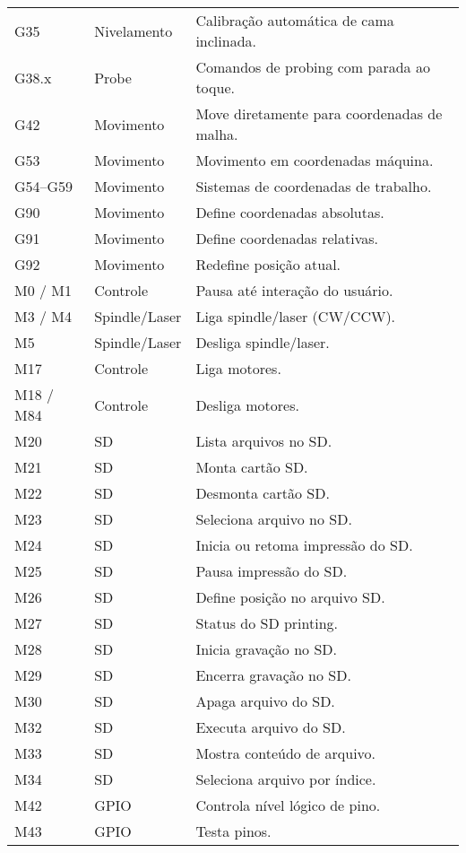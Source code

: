 \begin{longtable}{|l|l|p{\funcwidth}|}
			G35 & Nivelamento & Calibração automática de cama inclinada. \\
			G38.x & Probe & Comandos de probing com parada ao toque. \\
			G42 & Movimento & Move diretamente para coordenadas de malha. \\
			G53 & Movimento & Movimento em coordenadas máquina. \\
			G54--G59 & Movimento & Sistemas de coordenadas de trabalho. \\
			G90 & Movimento & Define coordenadas absolutas. \\
			G91 & Movimento & Define coordenadas relativas. \\
			G92 & Movimento & Redefine posição atual. \\
			\hline
			
			M0 / M1 & Controle & Pausa até interação do usuário. \\
			M3 / M4 & Spindle/Laser & Liga spindle/laser (CW/CCW). \\
			M5 & Spindle/Laser & Desliga spindle/laser. \\
			M17 & Controle & Liga motores. \\
			M18 / M84 & Controle & Desliga motores. \\
			M20 & SD & Lista arquivos no SD. \\
			M21 & SD & Monta cartão SD. \\
			M22 & SD & Desmonta cartão SD. \\
			M23 & SD & Seleciona arquivo no SD. \\
			M24 & SD & Inicia ou retoma impressão do SD. \\
			M25 & SD & Pausa impressão do SD. \\
			M26 & SD & Define posição no arquivo SD. \\
			M27 & SD & Status do SD printing. \\
			M28 & SD & Inicia gravação no SD. \\
			M29 & SD & Encerra gravação no SD. \\
			M30 & SD & Apaga arquivo do SD. \\
			M32 & SD & Executa arquivo do SD. \\
			M33 & SD & Mostra conteúdo de arquivo. \\
			M34 & SD & Seleciona arquivo por índice. \\
			M42 & GPIO & Controla nível lógico de pino. \\
			M43 & GPIO & Testa pinos. \\

\end{longtable}
